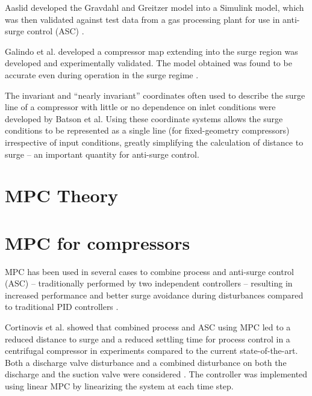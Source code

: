 Aaslid developed the Gravdahl and Greitzer model into a Simulink model, which was then validated against test data from a gas processing plant for use in anti-surge control (ASC) \cite{Aaslid2009}. 

Galindo et al. developed a compressor map extending into the surge region was developed and experimentally validated. The model obtained was found to be accurate even during operation in the surge regime \cite{Galindo2008}.

The invariant and ``nearly invariant'' coordinates often used to describe the surge line of a compressor with little or no dependence on inlet conditions were developed by Batson et al. \cite{Batson1996}
Using these coordinate systems allows the surge conditions to be represented as a single line (for fixed-geometry compressors) irrespective of input conditions, greatly simplifying the calculation of distance to surge -- an important quantity for anti-surge control.


\section{MPC Theory}

\section{MPC for compressors}
MPC has been used in several cases to combine process and anti-surge control (ASC) -- traditionally performed by two independent controllers -- resulting in increased performance and better surge avoidance during disturbances compared to traditional PID controllers \cite{Cortinovis2015,Budinis2015}.

Cortinovis et al. showed that combined process and ASC using MPC led to a reduced distance to surge and a reduced settling time for process control in a centrifugal compressor in experiments compared to the current state-of-the-art. 
Both a discharge valve disturbance and a combined disturbance on both the discharge and the suction valve were considered \cite{Cortinovis2015}. 
The controller was implemented using linear MPC by linearizing the system at each time step. 

